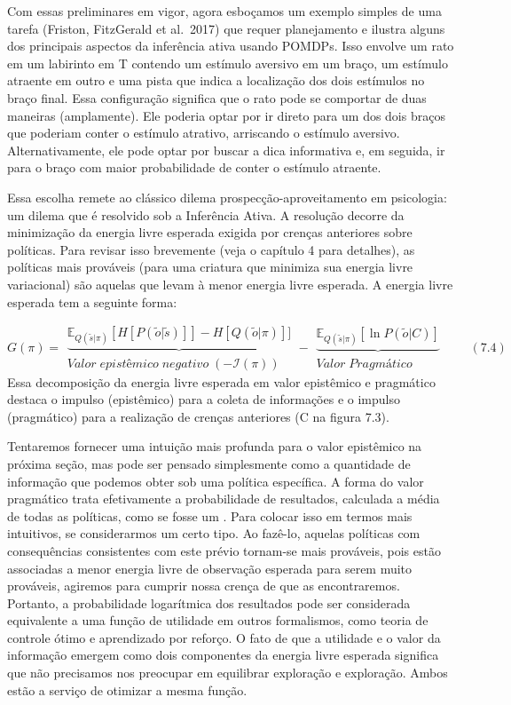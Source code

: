 \documentclass[
  12pt,
]{book}
\begin{document}
Com essas preliminares em vigor, agora esboçamos um exemplo simples de uma tarefa (Friston, FitzGerald et al.~2017) que requer planejamento e ilustra alguns dos principais aspectos da inferência ativa usando POMDPs. Isso envolve um rato em um labirinto em T contendo um estímulo aversivo em um braço, um estímulo atraente em outro e uma pista que indica a localização dos dois estímulos no braço final. Essa configuração significa que o rato pode se comportar de duas maneiras (amplamente). Ele poderia optar por ir direto para um dos dois braços que poderiam conter o estímulo atrativo, arriscando o estímulo aversivo. Alternativamente, ele pode optar por buscar a dica informativa e, em seguida, ir para o braço com maior probabilidade de conter o estímulo atraente.

Essa escolha remete ao clássico dilema prospecção-aproveitamento em psicologia: um dilema que é resolvido sob a Inferência Ativa. A resolução decorre da minimização da energia livre esperada exigida por crenças anteriores sobre políticas. Para revisar isso brevemente (veja o capítulo 4 para detalhes), as políticas mais prováveis (para uma criatura que minimiza sua energia livre variacional) são aquelas que levam à menor energia livre esperada. A energia livre esperada tem a seguinte forma:

\[G(\pi) = 
\begin{matrix} \underbrace {\mathbb E_{Q(\tilde s | \pi)}[H[P(\tilde o| \tilde s)]]-H[Q(\tilde o|\pi)]]} \\ Valor\;epistêmico\;negativo\;(−\mathcal I(\pi)) \end{matrix} - 
\begin{matrix}\underbrace {\mathbb E_{Q(\tilde s | \pi)}[\ln P(\tilde o | C)] } \\ Valor\;Pragmático  \end{matrix}\qquad (7.4)\]
Essa decomposição da energia livre esperada em valor epistêmico e pragmático destaca o impulso (epistêmico) para a coleta de informações e o impulso (pragmático) para a realização de crenças anteriores (C na figura 7.3).

Tentaremos fornecer uma intuição mais profunda para o valor epistêmico na próxima seção, mas pode ser pensado simplesmente como a quantidade de informação que podemos obter sob uma política específica. A forma do valor pragmático trata efetivamente a probabilidade de resultados, calculada a média de todas as políticas, como se fosse um . Para colocar isso em termos mais intuitivos, se considerarmos um certo tipo. Ao fazê-lo, aquelas políticas com consequências consistentes com este prévio tornam-se mais prováveis, pois estão associadas a menor energia livre de observação esperada para serem muito prováveis, agiremos para cumprir nossa crença de que as encontraremos. Portanto, a probabilidade logarítmica dos resultados pode ser considerada equivalente a uma função de utilidade em outros formalismos, como teoria de controle ótimo e aprendizado por reforço. O fato de que a utilidade e o valor da informação emergem como dois componentes da energia livre esperada significa que não precisamos nos preocupar em equilibrar exploração e exploração. Ambos estão a serviço de otimizar a mesma função.
\end{document}
